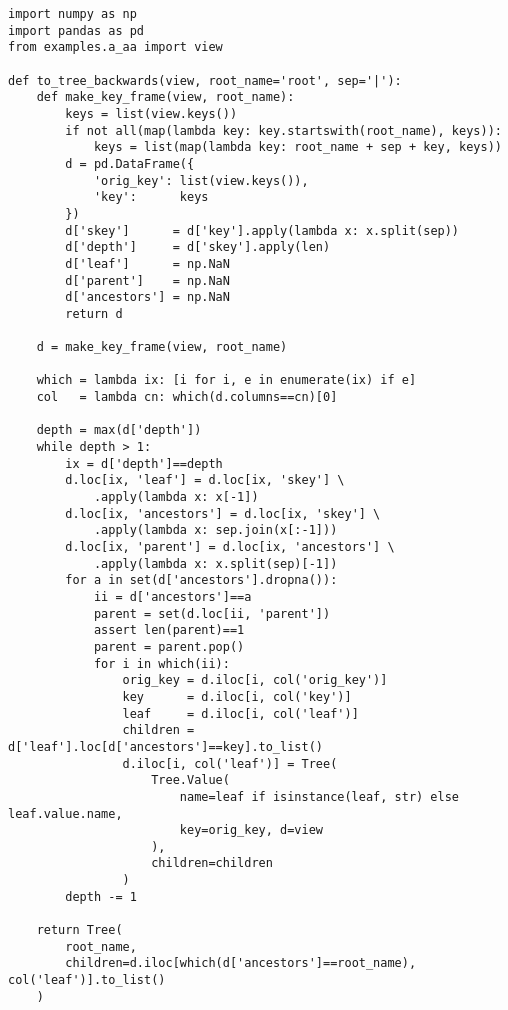 \documentclass[10pt]{amsart}
\numberwithin{equation}{section}
\begin{document}
\begin{verbatim}
import numpy as np
import pandas as pd
from examples.a_aa import view

def to_tree_backwards(view, root_name='root', sep='|'):
    def make_key_frame(view, root_name):
        keys = list(view.keys())
        if not all(map(lambda key: key.startswith(root_name), keys)):
            keys = list(map(lambda key: root_name + sep + key, keys))
        d = pd.DataFrame({
            'orig_key': list(view.keys()),
            'key':      keys
        })
        d['skey']      = d['key'].apply(lambda x: x.split(sep))
        d['depth']     = d['skey'].apply(len)
        d['leaf']      = np.NaN
        d['parent']    = np.NaN
        d['ancestors'] = np.NaN
        return d

    d = make_key_frame(view, root_name)

    which = lambda ix: [i for i, e in enumerate(ix) if e]
    col   = lambda cn: which(d.columns==cn)[0]

    depth = max(d['depth'])
    while depth > 1:
        ix = d['depth']==depth
        d.loc[ix, 'leaf'] = d.loc[ix, 'skey'] \
            .apply(lambda x: x[-1])
        d.loc[ix, 'ancestors'] = d.loc[ix, 'skey'] \
            .apply(lambda x: sep.join(x[:-1]))
        d.loc[ix, 'parent'] = d.loc[ix, 'ancestors'] \
            .apply(lambda x: x.split(sep)[-1])
        for a in set(d['ancestors'].dropna()):
            ii = d['ancestors']==a
            parent = set(d.loc[ii, 'parent'])
            assert len(parent)==1
            parent = parent.pop()
            for i in which(ii):
                orig_key = d.iloc[i, col('orig_key')] 
                key      = d.iloc[i, col('key')] 
                leaf     = d.iloc[i, col('leaf')]
                children = d['leaf'].loc[d['ancestors']==key].to_list()
                d.iloc[i, col('leaf')] = Tree(
                    Tree.Value( 
                        name=leaf if isinstance(leaf, str) else leaf.value.name, 
                        key=orig_key, d=view
                    ), 
                    children=children
                )
        depth -= 1

    return Tree(
        root_name, 
        children=d.iloc[which(d['ancestors']==root_name), col('leaf')].to_list()
    )
\end{verbatim}

\begin{verbatim}



\end{verbatim}
\end{document}
